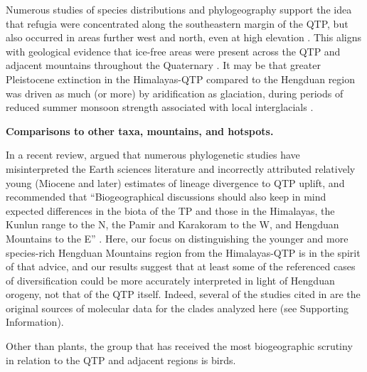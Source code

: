 Numerous studies of species distributions \citep[e.g.,][]{srinivasan2014,lopez2011} and phylogeography \citep[e.g.,][]{CunY2010,WangBS2011,lei2014,meng2015} support the idea that refugia were concentrated along the southeastern margin of the QTP, but also occurred in areas further west and north, even at high elevation \citep[e.g.,][]{wang2009,sun2010,opgenoorth2010}. This aligns with geological evidence that ice-free areas were present across the QTP and adjacent mountains throughout the Quaternary \citep[see][]{owen2014}. It may be that greater Pleistocene extinction in the Himalayas-QTP compared to the Hengduan region was driven as much (or more) by aridification as glaciation, during periods of reduced summer monsoon strength associated with local interglacials \citep{owen2008}.



\textbf{Comparisons to other taxa, mountains, and hotspots.}

In a recent review, \citet{Renner2016} argued that numerous phylogenetic studies have misinterpreted the Earth sciences literature and incorrectly attributed relatively young (Miocene and later) estimates of lineage divergence to QTP uplift, and recommended that ``Biogeographical discussions should also keep in mind expected differences in the biota of the TP and those in the Himalayas, the Kunlun range to the N, the Pamir and Karakoram to the W, and Hengduan Mountains to the E'' \citep[][p.~7]{Renner2016}. Here, our focus on distinguishing the younger and more species-rich Hengduan Mountains region from the Himalayas-QTP is in the spirit of that advice, and our results suggest that at least some of the referenced cases of diversification could be more accurately interpreted in light of Hengduan orogeny, not that of the QTP itself. Indeed, several of the studies cited in \citet{Renner2016} are the original sources of molecular data for the clades analyzed here (see Supporting Information).

Other than plants, the group that has received the most biogeographic scrutiny in relation to the QTP and adjacent regions is birds.

